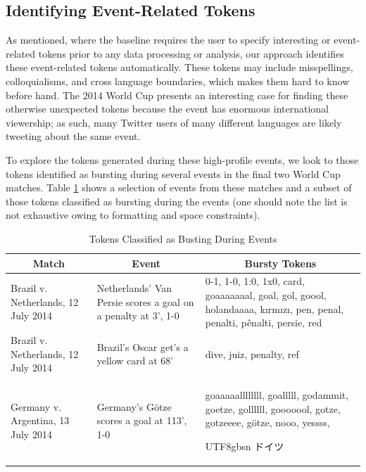 \documentclass{acm_proc_article-sp}
\newcommand{\myfont}{gbsn}
\begin{document}
\subsection{Identifying Event-Related Tokens}

As mentioned, where the baseline requires the user to specify interesting or event-related tokens prior to any data processing or analysis, our approach identifies these event-related tokens automatically.
These tokens may include misspellings, colloquialisms, and cross language boundaries, which makes them hard to know before hand.
The 2014 World Cup presents an interesting case for finding these otherwise unexpected tokens because the event has enormous international viewership; as such, many Twitter users of many different languages are likely tweeting about the same event.

To explore the tokens generated during these high-profile events, we look to those tokens identified as bursting during several events in the final two World Cup matches.
Table \ref{tab:burstyTokens} shows a selection of events from these matches and a subset of those tokens classified as bursting during the events (one should note the list is not exhaustive owing to formatting and space constraints).

\begin{table}[htdp]
\caption{Tokens Classified as Busting During Events}
\begin{center}
\begin{tabular}{|p{0.75in}|p{0.7in}| p{1.45in} |}
\hline
\multicolumn{1}{|c|}{\textbf{Match}} & \multicolumn{1}{|c|}{\textbf{Event}} & \multicolumn{1}{|c|}{\textbf{Bursty Tokens}} \\ \hline
Brazil v. Netherlands, 12 July 2014 & Netherlands' Van Persie scores a goal on a penalty at 3', 1-0 & 0-1, 1-0, 1:0, 1x0, card, goaaaaaaal, goal, gol, goool, holandaaaa, k\i{}rm\i{}z\i{}, pen, penal, penalti, p\^{e}nalti, persie, red \\ \hline
Brazil v. Netherlands, 12 July 2014 & Brazil's Oscar get's a yellow card at 68' & dive, juiz, penalty, ref \\ \hline
Germany v. Argentina, 13 July 2014 & Germany's G\"{o}tze scores a goal at 113', 1-0 & goaaaaallllllll, goalllll, godammit, goetze, gollllll, gooooool, gotze, gotzeeee, g\"{o}tze, nooo, yessss, \begin{CJK}{UTF8}{\myfont} ドイツ\end{CJK} \\ \hline
\end{tabular}
\end{center}
\label{tab:burstyTokens}
\end{table}
\end{document}
